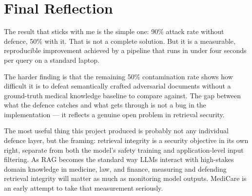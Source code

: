 \section{Final Reflection}

The result that sticks with me is the simple one: 90\% attack rate without defence, 50\% with it. That is not a complete solution. But it is a measurable, reproducible improvement achieved by a pipeline that runs in under four seconds per query on a standard laptop.

The harder finding is that the remaining 50\% contamination rate shows how difficult it is to defeat semantically crafted adversarial documents without a ground-truth medical knowledge baseline to compare against. The gap between what the defence catches and what gets through is not a bug in the implementation --- it reflects a genuine open problem in retrieval security.

The most useful thing this project produced is probably not any individual defence layer, but the framing: retrieval integrity is a security objective in its own right, separate from both the model's safety training and application-level input filtering. As RAG becomes the standard way LLMs interact with high-stakes domain knowledge in medicine, law, and finance, measuring and defending retrieval integrity will matter as much as monitoring model outputs. MediCare is an early attempt to take that measurement seriously.
